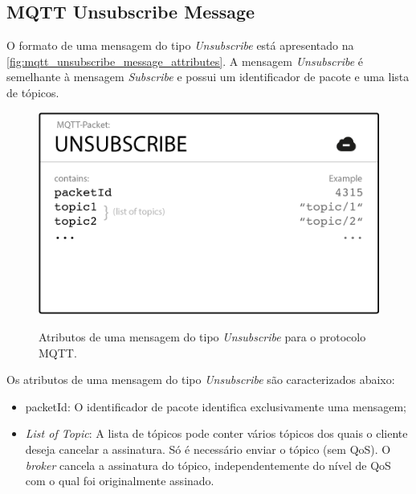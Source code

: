 \subsection{MQTT Unsubscribe Message}\label{subsection:mqtt_unsubscribe_message}

O formato de uma mensagem do tipo \textit{Unsubscribe} está apresentado na \autoref{fig:mqtt_unsubscribe_message_attributes}. A mensagem \textit{Unsubscribe} é semelhante à mensagem  \textit{Subscribe} e possui um identificador de pacote e uma lista de tópicos.

\begin{figure}[htbp]
	\centering
	\caption{Atributos de uma mensagem do tipo \textit{Unsubscribe} para o protocolo MQTT.}
	\includegraphics[scale=0.5]{Imagens/mqtt_unsubscribe_message_attributes.png}
	\label{fig:mqtt_unsubscribe_message_attributes}
\end{figure}

Os atributos de uma mensagem do tipo \textit{Unsubscribe} são caracterizados abaixo:

\begin{itemize}
	\item packetId: O identificador de pacote identifica exclusivamente uma mensagem;
	\item \textit{List of Topic}: A lista de tópicos pode conter vários tópicos dos quais o cliente deseja cancelar a assinatura. Só é necessário enviar o tópico (sem QoS). O \textit{broker} cancela a assinatura do tópico, independentemente do nível de QoS com o qual foi originalmente assinado.
\end{itemize}

